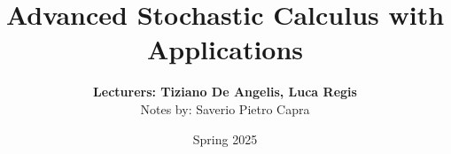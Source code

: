 \documentclass{article}
\title{Advanced Stochastic Calculus with Applications}
\author{\textbf{Lecturers: Tiziano De Angelis, Luca Regis} \\ Notes by: Saverio Pietro Capra}
\date{Spring 2025}
\begin{document}
\maketitle

\newpage


\newpage


\newpage


\newpage


\newpage


\newpage


\newpage


\newpage


\newpage


\newpage


\newpage


\newpage


\newpage


\newpage


\newpage
\nocite{*}
\printbibliography
\end{document}
